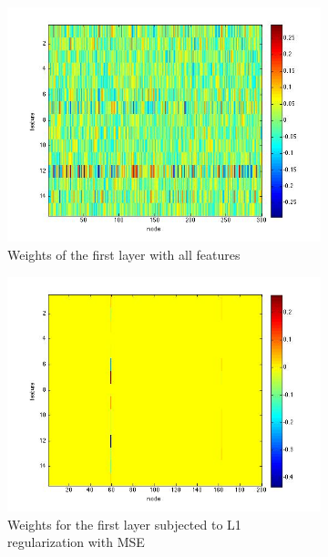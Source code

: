 \documentclass[conference]{IEEEtran}
\begin{document}
\begin{figure}
\begin{subfigure}{\linewidth}
\includegraphics[scale=0.4]{W1all.jpg}
\caption{Weights of the first layer with all features}\label{fig:W1}
\end{subfigure}%
\begin{subfigure}{\linewidth}
\includegraphics[scale=0.4]{L1MSE.jpg}
\caption{Weights for the first layer subjected to L1 regularization with MSE}\label{fig:L1MSE}
\end{subfigure}%
\begin{subfigure}{\linewidth}

\end{subfigure}
\end{figure}
\end{document}
